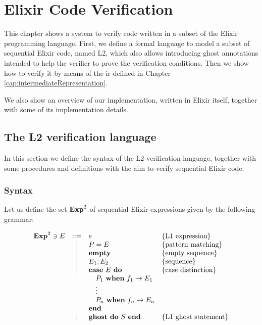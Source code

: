 \chapter{Elixir Code Verification}
\label{cap:elixirCodeVerification}


This chapter shows a system to verify code written in a subset of the Elixir 
programming language.  First, we define a formal language to model a subset of
sequential Elixir code, named L2, which also allows introducing ghost
annotations intended to help the verifier to prove the verification conditions.
Then we show how to verify it by means of the \gls{ir} defined in Chapter
\ref{cap:intermediateRepresentation}.

We also show an overview of our implementation, written in Elixir itself,
together with some of its implementation details.

\section{The L2 verification language}

In this section we define the syntax of the L2 verification language, together
with some procedures and definitions with the aim to verify sequential Elixir
code.

\subsection{Syntax}

Let us define the set $\mathbf{Exp}^{2}$ of sequential Elixir expressions given by the 
following grammar:

\[
\begin{array}{rcll}
\mathbf{Exp}^{2} \ni E & ::= & e & \{ \textrm{L1 expression} \} \\
& | & P = E & \{ \textrm{pattern matching} \} \\
& | & \textbf{empty} & \{ \textrm{empty sequence} \} \\
& | & E_1; E_2 & \{ \textrm{sequence} \} \\
& | & \textbf{case}~E~\textbf{do} & \{ \textrm{case distinction} \} \\
& & \quad P_1~\textbf{when}~f_1 \rightarrow E_1 \\
& & \quad \vdots\\
& & \quad P_n~\textbf{when}~f_n \rightarrow E_n \\
& & \textbf{end} \\
& | & \textbf{ghost}~\textbf{do}~S~\textbf{end} & \{ \textrm{L1 ghost statement} \} \\
\end{array}
\]

